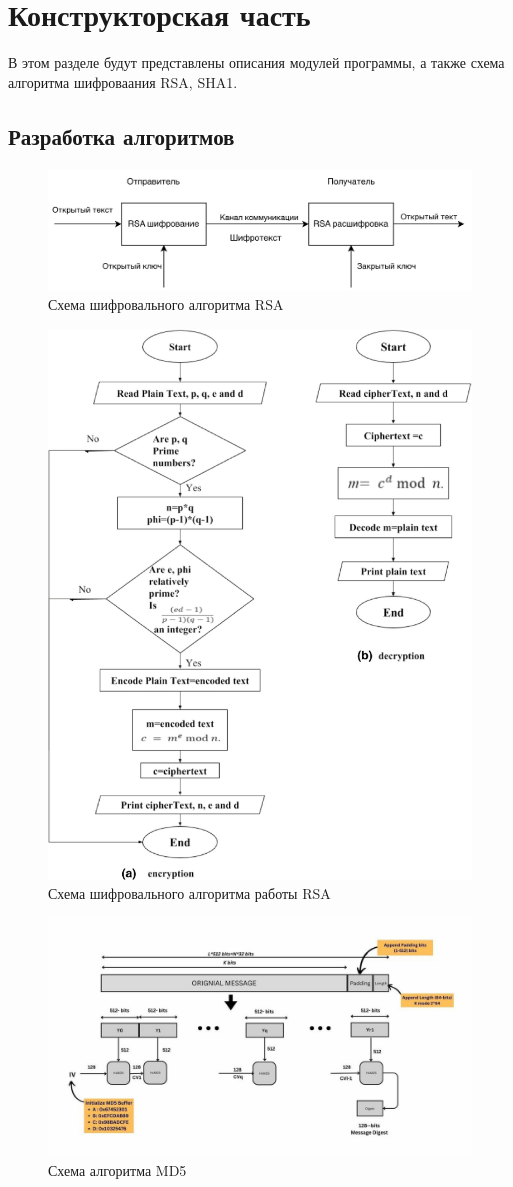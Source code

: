 \chapter{Конструкторская часть}

В этом разделе будут представлены описания модулей программы, а также схема алгоритма шифроваания RSA, SHA1.

\section{Разработка алгоритмов}

\begin{figure}[ht!]
	\centering
	\includegraphics[width=0.6\linewidth]{img/rsa.png}
	\caption{Схема шифровального алгоритма RSA}
	\label{img:rsa}
\end{figure}


\begin{figure}[ht!]
	\centering
	\includegraphics[width=0.6\linewidth]{img/rsa_work.png}
	\caption{Схема шифровального алгоритма работы RSA}
	\label{img:rsa_work}
\end{figure}

\begin{figure}[ht!]
	\centering
	\includegraphics[width=0.8\linewidth]{img/md5-1.jpg}
	\caption{Схема алгоритма MD5}
	\label{img:md5-1}
\end{figure}

